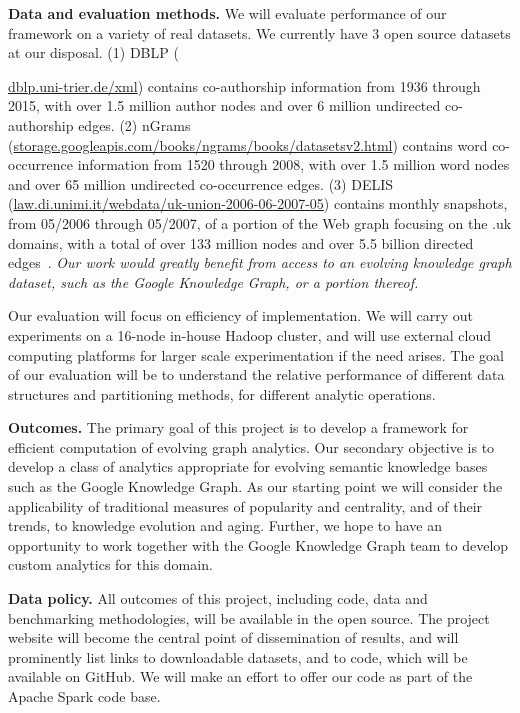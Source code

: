 \documentclass[11pt]{article}
\begin{document}
{\bf Data and evaluation methods.}  We will evaluate performance of
our framework on a variety of real datasets.  We currently have 3 open
source datasets at our disposal.  (1) DBLP
({\url{dblp.uni-trier.de/xml}) contains co-authorship information from
  1936 through 2015, with over 1.5 million author nodes and over 6
  million undirected co-authorship edges.  (2) nGrams
  (\url{storage.googleapis.com/books/ngrams/books/datasetsv2.html})
  contains word co-occurrence information from 1520 through 2008, with
  over 1.5 million word nodes and over 65 million undirected
  co-occurrence edges. (3) DELIS
  (\url{law.di.unimi.it/webdata/uk-union-2006-06-2007-05}) contains
  monthly snapshots, from 05/2006 through 05/2007, of a portion of the
  Web graph focusing on the .uk domains, with a total of over 133
  million nodes and over 5.5 billion directed edges~\cite{BSVLTAG}.
  {\em Our work would greatly benefit from access to an evolving
    knowledge graph dataset, such as the Google Knowledge Graph, or a
    portion thereof.}

Our evaluation will focus on efficiency of implementation.  We will
carry out experiments on a 16-node in-house Hadoop cluster, and will
use external cloud computing platforms for larger scale
experimentation if the need arises.  The goal of our evaluation will
be to understand the relative performance of different data structures
and partitioning methods, for different analytic operations.

{\bf Outcomes.} The primary goal of this project is to develop a
framework for efficient computation of evolving graph analytics.  Our
secondary objective is to develop a class of analytics appropriate for
evolving semantic knowledge bases such as the Google Knowledge
Graph. As our starting point we will consider the applicability of
traditional measures of popularity and centrality, and of their
trends, to knowledge evolution and aging.  Further, we hope to have an
opportunity to work together with the Google Knowledge Graph team to
develop custom analytics for this domain.

\vspace{+0.2cm} {\bf Data policy.}  All outcomes of this project,
including code, data and benchmarking methodologies, will be available
in the open source.  The project website will become the central point
of dissemination of results, and will prominently list links to
downloadable datasets, and to code, which will be available on GitHub.
We will make an effort to offer our code as part of the Apache Spark
code base.

}
\end{document}
